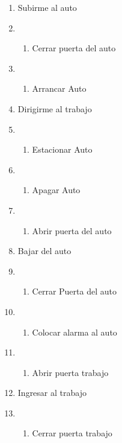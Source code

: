 \begin{enumerate}
\item
  Subirme al auto
\item
  \begin{enumerate}
  \def\labelenumii{\arabic{enumii}.}
  \tightlist
  \item
    Cerrar puerta del auto
  \end{enumerate}
\item
  \begin{enumerate}
  \def\labelenumii{\arabic{enumii}.}
  \setcounter{enumii}{1}
  \tightlist
  \item
    Arrancar Auto
  \end{enumerate}
\item
  Dirigirme al trabajo
\item
  \begin{enumerate}
  \def\labelenumii{\arabic{enumii}.}
  \tightlist
  \item
    Estacionar Auto
  \end{enumerate}
\item
  \begin{enumerate}
  \def\labelenumii{\arabic{enumii}.}
  \setcounter{enumii}{1}
  \tightlist
  \item
    Apagar Auto
  \end{enumerate}
\item
  \begin{enumerate}
  \def\labelenumii{\arabic{enumii}.}
  \setcounter{enumii}{2}
  \tightlist
  \item
    Abrir puerta del auto
  \end{enumerate}
\item
  Bajar del auto
\item
  \begin{enumerate}
  \def\labelenumii{\arabic{enumii}.}
  \tightlist
  \item
    Cerrar Puerta del auto
  \end{enumerate}
\item
  \begin{enumerate}
  \def\labelenumii{\arabic{enumii}.}
  \setcounter{enumii}{1}
  \tightlist
  \item
    Colocar alarma al auto
  \end{enumerate}
\item
  \begin{enumerate}
  \def\labelenumii{\arabic{enumii}.}
  \setcounter{enumii}{2}
  \tightlist
  \item
    Abrir puerta trabajo
  \end{enumerate}
\item
  Ingresar al trabajo
\item
  \begin{enumerate}
  \def\labelenumii{\arabic{enumii}.}
  \tightlist
  \item
    Cerrar puerta trabajo
  \end{enumerate}
\end{enumerate}
